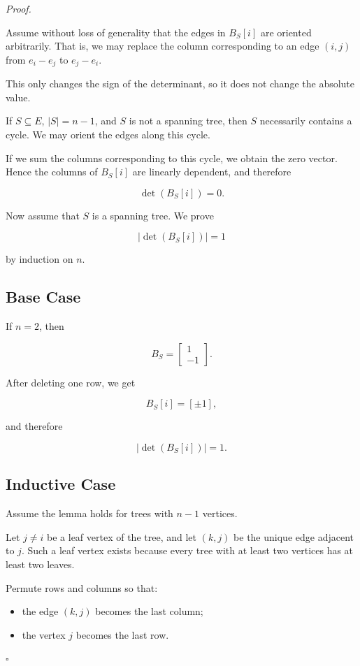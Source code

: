 \documentclass[
  a4paper,
  10pt]{article}
\providecommand{\tightlist}{%
  \setlength{\itemsep}{0pt}\setlength{\parskip}{0pt}}
\newenvironment{proofbox}
  {\par\medskip\noindent\textit{Proof.}\quad}
  {\hfill$\square$\par\medskip}
\begin{document}
\begin{proofbox}

Assume without loss of generality that the edges in \(B_S[i]\) are
oriented arbitrarily. That is, we may replace the column corresponding
to an edge \((i,j)\) from \(e_i-e_j\) to \(e_j-e_i\).

This only changes the sign of the determinant, so it does not change the
absolute value.

If \(S\subseteq E\), \(\lvert S\rvert=n-1\), and \(S\) is not a spanning
tree, then \(S\) necessarily contains a cycle. We may orient the edges
along this cycle.

If we sum the columns corresponding to this cycle, we obtain the zero
vector. Hence the columns of \(B_S[i]\) are linearly dependent, and
therefore

\[
\det(B_S[i])=0.
\]

Now assume that \(S\) is a spanning tree. We prove

\[
\left|\det(B_S[i])\right|=1
\]

by induction on \(n\).

\subsection{Base Case}\label{base-case}

If \(n=2\), then

\[
B_S=
\begin{bmatrix}
1\\
-1
\end{bmatrix}.
\]

After deleting one row, we get

\[
B_S[i]=[\pm 1],
\]

and therefore

\[
\left|\det(B_S[i])\right|=1.
\]

\subsection{Inductive Case}\label{inductive-case}

Assume the lemma holds for trees with \(n-1\) vertices.

Let \(j\ne i\) be a leaf vertex of the tree, and let \((k,j)\) be the
unique edge adjacent to \(j\). Such a leaf vertex exists because every
tree with at least two vertices has at least two leaves.

Permute rows and columns so that:

\begin{itemize}
\tightlist
\item
  the edge \((k,j)\) becomes the last column;
\item
  the vertex \(j\) becomes the last row.
\end{itemize}


\end{proofbox}
\end{document}

